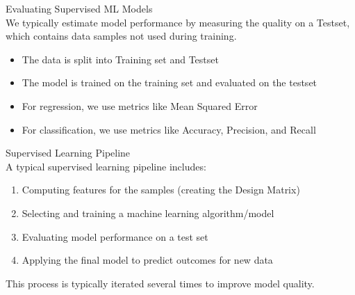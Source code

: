 \begin{definition}{Evaluating Supervised ML Models}\\
We typically estimate model performance by measuring the quality on a Testset, which contains data samples not used during training.
\begin{itemize}
    \item The data is split into Training set and Testset
    \item The model is trained on the training set and evaluated on the testset
    \item For regression, we use metrics like Mean Squared Error
    \item For classification, we use metrics like Accuracy, Precision, and Recall
\end{itemize}
\end{definition}

\begin{concept}{Supervised Learning Pipeline}\\
A typical supervised learning pipeline includes:
\begin{enumerate}
    \item Computing features for the samples (creating the Design Matrix)
    \item Selecting and training a machine learning algorithm/model
    \item Evaluating model performance on a test set
    \item Applying the final model to predict outcomes for new data
\end{enumerate}
This process is typically iterated several times to improve model quality.
\end{concept}

\multend


